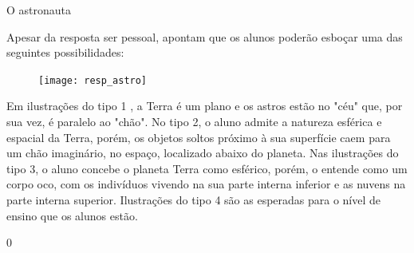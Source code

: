 \begin{answer}{O astronauta}
{Apesar da resposta ser pessoal, \cite{Nardi} apontam que  os alunos poderão esboçar  uma das seguintes possibilidades: 
  
 \begin{figure}[H]
  \centering
    \texttt{[image: resp\_astro]}
  \end{figure}
  
Em ilustrações do tipo 1 , a Terra é um plano e os astros estão no "céu" que, por sua vez, é paralelo ao "chão". 
No tipo 2, o aluno admite a natureza esférica e espacial da Terra, porém, os objetos soltos próximo à sua superfície caem  para um chão imaginário, no espaço, localizado abaixo do planeta. Nas ilustrações do tipo 3, o aluno concebe o planeta Terra como esférico, porém, o entende como um corpo oco, com os indivíduos vivendo na sua parte interna inferior e as nuvens na parte interna superior. Ilustrações do tipo 4 são as esperadas para o nível de ensino que os alunos estão. }{0}
\end{answer}

